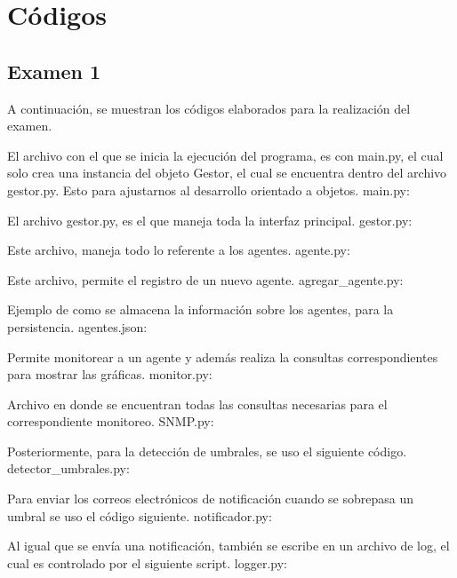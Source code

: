 \chapter{Códigos}
\section{Examen 1}
A continuación, se muestran los códigos elaborados para la realización del examen.

El archivo con el que se inicia la ejecución del programa, es con main.py, el cual solo crea una instancia del objeto Gestor, el cual se encuentra dentro del archivo gestor.py. Esto para ajustarnos al desarrollo orientado a objetos.\newline
main.py:


El archivo gestor.py, es el que maneja toda la interfaz principal.\newline
gestor.py:

Este archivo, maneja todo lo referente a los agentes.\newline
agente.py:

Este archivo, permite el registro de un nuevo agente.\newline
agregar\_agente.py:

Ejemplo de como se almacena la información sobre los agentes, para la persistencia.\newline
agentes.json:

Permite monitorear a un agente y además realiza la consultas correspondientes para mostrar las gráficas.\newline
monitor.py:

Archivo en donde se encuentran todas las consultas necesarias para el correspondiente monitoreo.\newline
SNMP.py:

Posteriormente, para la detección de umbrales, se uso el siguiente código.\newline
detector\_umbrales.py:

Para enviar los correos electrónicos de notificación cuando se sobrepasa un umbral se uso el código siguiente.\newline
notificador.py:

Al igual que se envía una notificación, también se escribe en un archivo de log, el cual es controlado por el siguiente script.\newline
logger.py:


